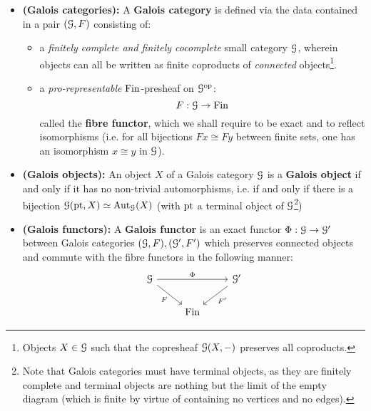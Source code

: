         \begin{definition} \label{def: galois_categories}
            \noindent
            \begin{itemize}
                \item \textbf{(Galois categories):} A \textbf{Galois category} is defined via the data contained in a pair $(\mathcal{G}, F)$ consisting of:
                \begin{itemize}
                    \item a \textit{finitely complete and finitely cocomplete} small category $\mathcal{G}$, wherein objects can all be written as finite coproducts of \textit{connected} objects\footnote{Objects $X \in \mathcal{G}$ such that the copresheaf $\mathcal{G}(X, -)$ preserves all coproducts.}.
                    \item a \textit{pro-representable} $\mathrm{Fin}$-presheaf on $\mathcal{G}^{\mathrm{op}}$:
                        $$F: \mathcal{G} \to \mathrm{Fin}$$
                    called the \textbf{fibre functor}, which we shall require to be exact and to reflect isomorphisms (i.e. for all bijections $Fx \cong Fy$ between finite sets, one has an isomorphism $x \cong y$ in $\mathcal{G}$).
                \end{itemize}
                \item \textbf{(Galois objects):} An object $X$ of a Galois category $\mathcal{G}$ is a \textbf{Galois object} if and only if it has no non-trivial automorphisms, i.e. if and only if there is a bijection $\mathcal{G}(\mathrm{pt}, X) \simeq \mathrm{Aut}_{\mathcal{G}}(X)$ (with $\mathrm{pt}$ a terminal object of $\mathcal{G}$\footnote{Note that Galois categories must have terminal objects, as they are finitely complete and terminal objects are nothing but the limit of the empty diagram (which is finite by virtue of containing no vertices and no edges).})
                \item \textbf{(Galois functors):} A \textbf{Galois functor} is an exact functor $\Phi: \mathcal{G} \to \mathcal{G}'$ between Galois categories $(\mathcal{G}, F), (\mathcal{G}', F')$ which preserves connected objects and commute with the fibre functors in the following manner:
                    $$
                        \begin{tikzcd}
                        	\calG && {\calG'} \\
                        	& \Fin
                        	\arrow["F"', from=1-1, to=2-2]
                        	\arrow["{F'}", from=1-3, to=2-2]
                        	\arrow["\Phi", from=1-1, to=1-3]
                        \end{tikzcd}
                    $$
            \end{itemize}
        \end{definition}
